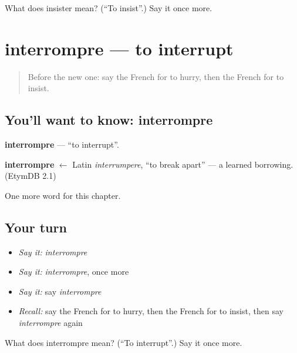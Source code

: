 \begin{tcolorbox}[breakable,colback=teal!4,colframe=teal!35!black,title={Before you move on}]
What does insister mean? (\textquotedblleft{}To insist\textquotedblright{}.) Say it once more.
\end{tcolorbox}
\section[interrompre]{interrompre — to interrupt}

\label{lesson:FR-C240-interrompre}



\begin{quote}
Before the new one: say the French for to hurry, then the French for to insist.
\end{quote}

\subsection*{You'll want to know: interrompre}
\textbf{interrompre} — \textquotedblleft{}to interrupt\textquotedblright{}.

\begin{cousinweb}
\textbf{interrompre} $\leftarrow$ Latin \emph{interrumpere}, \textquotedblleft{}to break apart\textquotedblright{} — a learned borrowing. (EtymDB 2.1)
\end{cousinweb}

\begin{grammarlens}[title={What you've built}]
One more word for this chapter.
\end{grammarlens}

\subsection*{Your turn}
\begin{itemize}
\raggedright
  \item \emph{Say it:} \emph{interrompre}
  \item \emph{Say it:} \emph{interrompre}, once more
  \item \emph{Say it:} say \emph{interrompre}
  \item \emph{Recall:} say the French for to hurry, then the French for to insist, then say \emph{interrompre} again
\end{itemize}

\begin{tcolorbox}[breakable,colback=teal!4,colframe=teal!35!black,title={Before you move on}]
What does interrompre mean? (\textquotedblleft{}To interrupt\textquotedblright{}.) Say it once more.
\end{tcolorbox}
